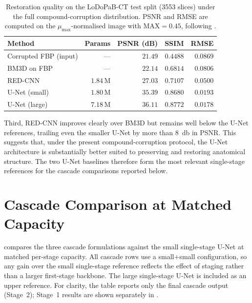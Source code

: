 \begin{table}[!htb]
    \centering
    \caption[Baseline references on LoDoPaB-CT under compound corruption.]{%
        Restoration quality on the LoDoPaB-CT test split
        (\num{3553} slices) under the full compound-corruption
        distribution. PSNR and RMSE are computed on the $\mu_{\max}$-normalised image
        with $\mathrm{MAX}=0.45$, following \cite{Leuschner2021}.}
    \label{tab:exp_baselines}
    \setlength{\tabcolsep}{6pt}
    \small
    \begin{tabular}{@{}l r r r r@{}}
        \toprule
        Method                              & Params    & PSNR (dB) & SSIM     & RMSE    \\
        \midrule
        Corrupted FBP (input)               & ---       & $21.49$   & $0.4488$ & $0.0869$ \\
        BM3D on FBP~\cite{Dabov2007}        & ---       & $22.14$   & $0.6814$ & $0.0806$ \\
        RED-CNN~\cite{Chen2017}             & $1.84$\,M & $27.03$   & $0.7107$ & $0.0500$ \\
        U-Net (small)                       & $1.80$\,M & $35.39$   & $0.8680$ & $0.0193$ \\
        U-Net (large)                       & $7.18$\,M & $\mathbf{36.11}$ & $\mathbf{0.8772}$ & $\mathbf{0.0178}$ \\
        \bottomrule
    \end{tabular}
\end{table}

Third, RED-CNN improves clearly over BM3D but remains well below the U-Net references, trailing even the smaller U-Net by more than \SI{8}{\decibel} in PSNR. This suggests that, under the present compound-corruption protocol, the U-Net architecture is substantially better suited to preserving and restoring anatomical structure. The two U-Net baselines therefore form the most relevant single-stage references for the cascade comparisons reported below.
\section{Cascade Comparison at Matched Capacity}
\label{sec:exp_cascade}

 compares the three cascade formulations against the small single-stage U-Net at matched per-stage capacity. All cascade rows use a small$+$small configuration, so any gain over the small single-stage reference reflects the effect of staging rather than a larger first-stage backbone. The large single-stage U-Net is included as an upper reference. For clarity, the table reports only the final cascade output (Stage~2); Stage~1 results are shown separately in .


